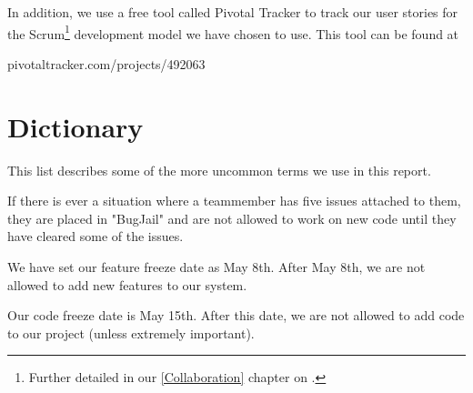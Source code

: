 In addition, we use a free tool called Pivotal Tracker to track our user stories for the Scrum\footnote{Further detailed in our \ref{Collaboration} chapter on \pageref{Collaboration}.} development model we have chosen to use. This tool can be found at \begin{my_itemize}\item pivotaltracker.com/projects/492063\end{my_itemize}
\section{Dictionary}
\label{Preface_Dictionary}
This list describes some of the more uncommon terms we use in this report.
\begin{my_description}
\item[BugJail] If there is ever a situation where a teammember has five issues attached to them, they are placed in "BugJail" and are not allowed to work on new code until they have cleared some of the issues.
\item[Feature Freeze] We have set our feature freeze date as May 8th. After May 8th, we are not allowed to add new features to our system.
\item[Code Freeze] Our code freeze date is May 15th. After this date, we are not allowed to add code to our project (unless extremely important).
\end{my_description}